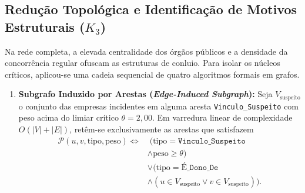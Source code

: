 \subsection{Redução Topológica e Identificação de Motivos Estruturais ($K_3$)} 
Na rede completa, a elevada centralidade dos órgãos públicos e a densidade da concorrência regular ofuscam as estruturas de conluio. Para isolar os núcleos críticos, aplicou-se uma cadeia sequencial de quatro algoritmos formais em grafos. 
\begin{enumerate} 
\item \textbf{Subgrafo Induzido por Arestas (\textit{Edge-Induced Subgraph}):} Seja $V_{\text{suspeito}}$ o conjunto das empresas incidentes em alguma aresta \texttt{Vinculo\_Suspeito} com peso acima do limiar crítico $\theta = 2,00$. Em varredura linear de complexidade $O(|V|+|E|)$, retêm-se exclusivamente as arestas que satisfazem \begin{equation} \begin{aligned} \mathcal{P}(u,v,\mathrm{tipo},\mathrm{peso}) \iff &\;(\mathrm{tipo}=\texttt{Vinculo\_Suspeito} \\ &\land \mathrm{peso}\geq\theta) \\ &\lor (\mathrm{tipo}=\texttt{É\_Dono\_De} \\ &\land (u\in V_{\text{suspeito}} \lor v\in V_{\text{suspeito}})). \end{aligned} \end{equation} \

\end{enumerate}
